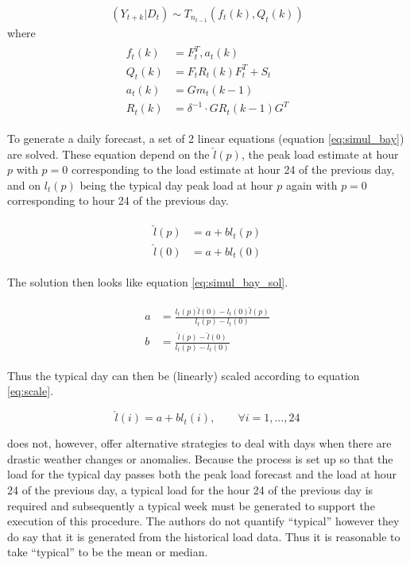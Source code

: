 \documentclass[a4paper]{article}
\begin{document}
\begin{enumerate}
%
\begin{align} \label{eq:kbayforecast}
(Y_{t+k}|D_t) \sim T_{n_{t-1}}(f_t(k),Q_t(k))
\end{align}
%
where
%
\begin{align*}
\begin{split}
f_t(k) &= F_t^T,a_t(k) \\
Q_t(k) &= F_t R_t(k) F_t^T + S_t \\
a_t(k) &= Gm_t(k-1) \\
R_t(k) &= \delta^{-1}\cdot GR_t(k-1)G^T
\end{split}
\end{align*}
%
\end{enumerate}

To generate a daily forecast, a set of 2 linear equations (equation \ref{eq:simul_bay}) are solved. These equation depend on the $\hat{l}(p)$, the peak load estimate at hour $p$ with $p=0$ corresponding to the load estimate at hour 24 of the previous day, and on $l_t(p)$ being the typical day peak load at hour $p$ again with $p=0$ corresponding to hour 24 of the previous day.

\begin{align} \label{eq:simul_bay}
\begin{split}
\hat{l}(p) &= a + bl_t(p) \\
\hat{l}(0) &= a + bl_t(0)
\end{split}
\end{align}

\noindent The solution then looks like equation \ref{eq:simul_bay_sol}.

\begin{align} \label{eq:simul_bay_sol}
\begin{split}
a &= \frac{l_t(p)\hat{l}(0) - l_t(0)\hat{l}(p)}{l_t(p) - l_t(0)} \\
b &= \frac{\hat{l}(p) - \hat{l}(0)}{l_t(p) - l_t(0)}
\end{split}
\end{align}

\noindent Thus the typical day can then be (linearly) scaled according to equation \ref{eq:scale}.

\begin{equation} \label{eq:scale}
\hat{l}(i) = a + bl_t(i), \qquad \forall i= 1,...,24
\end{equation}

\cite{douglas98} does not, however, offer alternative strategies to deal with days when there are drastic weather changes or anomalies. Because the process is set up so that the load for the typical day passes both the peak load forecast and the load at hour 24 of the previous day, a typical load for the hour 24 of the previous day is required and subsequently a typical week must be generated to support the execution of this procedure. The authors do not quantify ``typical'' however they do say that it is generated from the historical load data. Thus it is reasonable to take ``typical'' to be the mean or median.
\end{document}
